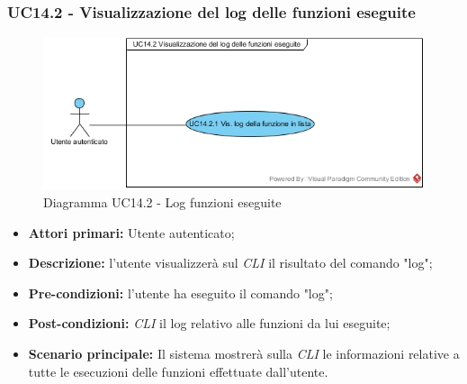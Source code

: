 \subsubsection{UC14.2 - Visualizzazione del log delle funzioni eseguite}
\begin{figure}[h]
	\centering
	\includegraphics[width=\linewidth]{res/img/UC14.2.jpg}
	\caption{Diagramma UC14.2 - Log funzioni eseguite}
\end{figure}
\begin{itemize}
	\item \textbf{Attori primari:} Utente autenticato;
	\item \textbf{Descrizione:} l'utente visualizzerà sul \textit{CLI\glo} il risultato del comando "log";
	\item \textbf{Pre-condizioni:} l'utente ha eseguito il comando "log";
	\item \textbf{Post-condizioni:} \textit{CLI\glo} il log relativo alle funzioni da lui eseguite;
	\item \textbf{Scenario principale:} Il sistema mostrerà sulla \textit{CLI\glo} le informazioni relative a tutte le esecuzioni delle funzioni effettuate dall'utente.
\end{itemize}
